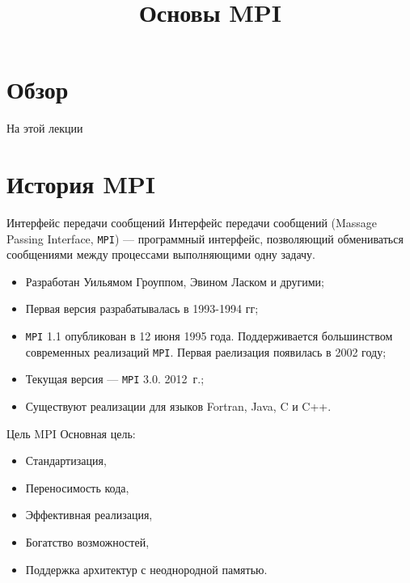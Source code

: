 

\title{Основы MPI}



\begin{frame}
\titlepage
\end{frame}

\section*{Обзор}

\begin{frame}{На этой лекции}
\tableofcontents
\end{frame}

\section{История MPI}

\begin{frame}{Интерфейс передачи сообщений}
Интерфейс передачи сообщений (\abbr Massage Passing Interface, \texttt{MPI}) --- программный интерфейс, позволяющий обмениваться сообщениями между процессами выполняющими одну задачу.
\vfill
\begin{itemize}
    \item Разработан Уильямом Гроуппом, Эвином Ласком и другими;
    \item Первая версия разрабатывалась в 1993-1994 гг;
    \item \texttt{MPI} 1.1 опубликован в 12 июня 1995 года. Поддерживается
    большинством современных реализаций \texttt{MPI}. Первая раелизация
    появилась в 2002 году;
    \item Текущая версия --- \texttt{MPI} 3.0. 2012~г.;
    \item Существуют реализации для языков Fortran, Java, C и C++.
\end{itemize}
\end{frame}

\begin{frame}{Цель MPI}
Основная цель:
\begin{itemize}
    \item Стандартизация,
    \item Переносимость кода,
    \item Эффективная реализация,
    \item Богатство возможностей,
    \item Поддержка архитектур с неоднородной памятью.
\end{itemize}
\end{frame}

